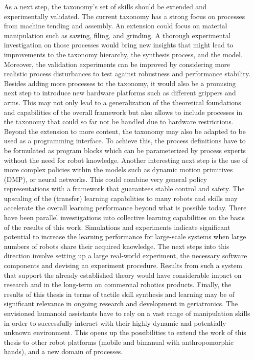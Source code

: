 As a next step, the taxonomy's set of skills should be extended and experimentally validated.
The current taxonomy has a strong focus on processes from machine tending and assembly.
An extension could focus on material manipulation such as sawing, filing, and grinding. A thorough experimental investigation on those processes would bring new insights that might lead to improvements to the taxonomy hierarchy, the synthesis process, and the \skillmodelabbr{} model.
Moreover, the validation experiments can be improved by considering more realistic process disturbances to test against robustness and performance stability.
Besides adding more processes to the taxonomy, it would also be a promising next step to introduce new hardware platforms such as different grippers and arms.
This may not only lead to a generalization of the theoretical foundations and capabilities of the overall framework but also allows to include processes in the taxonomy that could so far not be handled due to hardware restrictions.
Beyond the extension to more content, the taxonomy may also be adapted to be used as a programming interface.
To achieve this, the process definitions have to be formulated as program blocks which can be parameterized by process experts without the need for robot knowledge.
Another interesting next step is the use of more complex policies within the \skillmodelabbr{} models such as dynamic motion primitives (DMP), or neural networks. This could combine very general policy representations with a framework that guarantees stable control and safety.
The upscaling of the (transfer) learning capabilities to many robots and skills may accelerate the overall learning performance beyond what is possible today.
There have been parallel investigations into collective learning capabilities on the basis of the results of this work.
Simulations and experiments indicate significant potential to increase the learning performance for large-scale systems when large numbers of robots share their acquired knowledge.
The next steps into this direction involve setting up a large real-world experiment, the necessary software components and devising an experiment procedure. Results from such a system that support the already established theory would have considerable impact on research and in the long-term on commercial robotics products.
Finally, the results of this thesis in terms of tactile skill synthesis and learning may be of significant relevance in ongoing research and development in geriatronics.
The envisioned humanoid assistants have to rely on a vast range of manipulation skills in order to successfully interact with their highly dynamic and potentially unknown environment.
This opens up the possibilities to extend the work of this thesis to other robot platforms (mobile and bimanual with anthropomorphic hands), and a new domain of processes.
